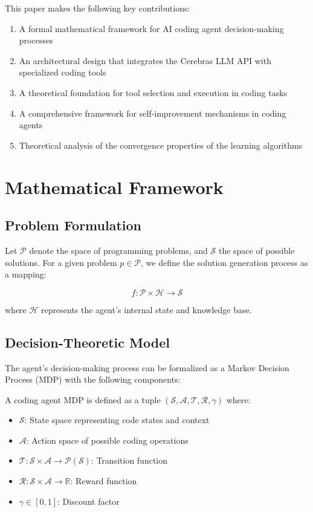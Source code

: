 \documentclass[11pt,a4paper]{article}
\begin{document}
This paper makes the following key contributions:

\begin{enumerate}
    \item A formal mathematical framework for AI coding agent decision-making processes
    \item An architectural design that integrates the Cerebras LLM API with specialized coding tools
    \item A theoretical foundation for tool selection and execution in coding tasks
    \item A comprehensive framework for self-improvement mechanisms in coding agents
    \item Theoretical analysis of the convergence properties of the learning algorithms
\end{enumerate}

\section{Mathematical Framework}

\subsection{Problem Formulation}

Let $\mathcal{P}$ denote the space of programming problems, and $\mathcal{S}$ the space of possible solutions. For a given problem $p \in \mathcal{P}$, we define the solution generation process as a mapping:

\begin{equation}
f: \mathcal{P} \times \mathcal{H} \rightarrow \mathcal{S}
\end{equation}

where $\mathcal{H}$ represents the agent's internal state and knowledge base.

\subsection{Decision-Theoretic Model}

The agent's decision-making process can be formalized as a Markov Decision Process (MDP) with the following components:

\begin{definition}
A coding agent MDP is defined as a tuple $(\mathcal{S}, \mathcal{A}, \mathcal{T}, \mathcal{R}, \gamma)$ where:
\begin{itemize}
    \item $\mathcal{S}$: State space representing code states and context
    \item $\mathcal{A}$: Action space of possible coding operations
    \item $\mathcal{T}: \mathcal{S} \times \mathcal{A} \rightarrow \mathcal{P}(\mathcal{S})$: Transition function
    \item $\mathcal{R}: \mathcal{S} \times \mathcal{A} \rightarrow \mathbb{R}$: Reward function
    \item $\gamma \in [0,1]$: Discount factor
\end{itemize}
\end{definition}
\end{document}
